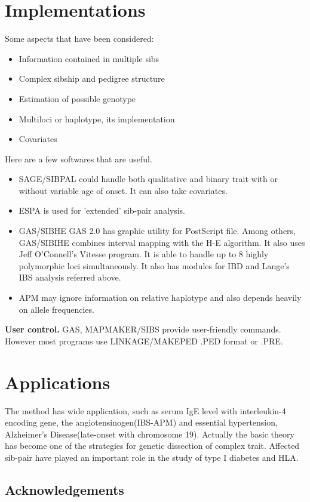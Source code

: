 \section{Implementations}
Some aspects that have been considered:
\begin{itemize}
\item Information contained in multiple sibs
\item Complex sibship and pedigree structure
\item Estimation of possible genotype
\item Multiloci or haplotype, its implementation
\item Covariates
\end{itemize}
Here are a few softwares that are useful.
\begin{itemize}
\item{SAGE/SIBPAL} could handle both qualitative and binary trait with
or without variable age of onset. It can also take covariates.
\item{ESPA} is used for 'extended' sib-pair analysis.
\item{GAS/SIBHE} GAS 2.0 has graphic utility for PostScript file.  Among
others, GAS/SIBIHE combines interval mapping with the H-E algorithm. It also
uses Jeff O'Connell's Vitesse program.  It is able to handle up to 8 highly
polymorphic loci simultaneously.  It also has modules for IBD and Lange's IBS
analysis referred above.
\item{APM} may ignore information on relative haplotype and also
depends heavily on allele frequencies.
\end{itemize}

{\bf User control.}  GAS, MAPMAKER/SIBS provide user-friendly commands.
However most programs use LINKAGE/MAKEPED .PED format or .PRE.

\section{Applications} The method has wide application, such as serum IgE
level with interleukin-4 encoding gene, the angiotensinogen(IBS-APM) and
essential hypertension, Alzheimer's Disease(late-onset with chromosome 19).
Actually the basic theory has become one of the strategies for genetic
dissection of complex trait.  Affected sib-pair have played an important role
in the study of type I diabetes and HLA.

\subsection*{Acknowledgements}

